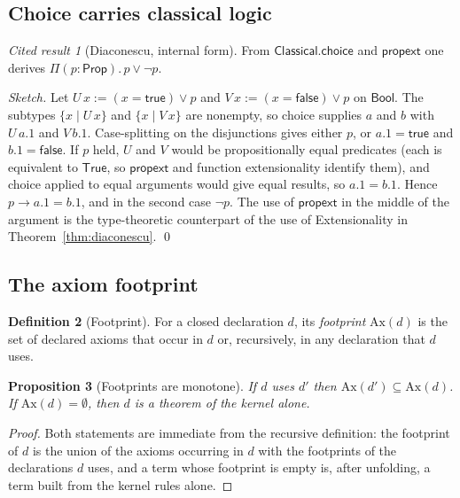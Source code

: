 \documentclass[11pt]{article}
\newcommand{\Prop}{\mathsf{Prop}}
\theoremstyle{definition}
\newtheorem{definition}{Definition}[section]
\theoremstyle{plain}
\newtheorem{proposition}[definition]{Proposition}
\theoremstyle{remark}
\newtheorem{cited}[definition]{Cited result}
\begin{document}
\subsection{Choice carries classical logic}

\begin{cited}[Diaconescu, internal form]\label{cit:diac-type}
From $\mathsf{Classical.choice}$ and $\mathsf{propext}$ one derives $\Pi(p:\Prop).\,p\vee\neg p$.
\end{cited}
\emph{Sketch.} Let $U\,x:=(x=\mathsf{true})\vee p$ and $V\,x:=(x=\mathsf{false})\vee p$ on $\mathsf{Bool}$. The subtypes $\{x\mid U\,x\}$ and $\{x\mid V\,x\}$ are nonempty, so choice supplies $a$ and $b$ with $U\,a.1$ and $V\,b.1$. Case-splitting on the disjunctions gives either $p$, or $a.1=\mathsf{true}$ and $b.1=\mathsf{false}$. If $p$ held, $U$ and $V$ would be propositionally equal predicates (each is equivalent to $\mathsf{True}$, so $\mathsf{propext}$ and function extensionality identify them), and choice applied to equal arguments would give equal results, so $a.1=b.1$. Hence $p\to a.1=b.1$, and in the second case $\neg p$. The use of $\mathsf{propext}$ in the middle of the argument is the type-theoretic counterpart of the use of Extensionality in Theorem~\ref{thm:diaconescu}. \qed

\subsection{The axiom footprint}

\begin{definition}[Footprint]\label{def:footprint}
For a closed declaration $d$, its \emph{footprint} $\mathrm{Ax}(d)$ is the set of declared axioms that occur in $d$ or, recursively, in any declaration that $d$ uses.
\end{definition}

\begin{proposition}[Footprints are monotone]\label{prop:foot}
If $d$ uses $d'$ then $\mathrm{Ax}(d')\subseteq\mathrm{Ax}(d)$. If $\mathrm{Ax}(d)=\emptyset$, then $d$ is a theorem of the kernel alone.
\end{proposition}
\begin{proof}
Both statements are immediate from the recursive definition: the footprint of $d$ is the union of the axioms occurring in $d$ with the footprints of the declarations $d$ uses, and a term whose footprint is empty is, after unfolding, a term built from the kernel rules alone.
\end{proof}
\end{document}
